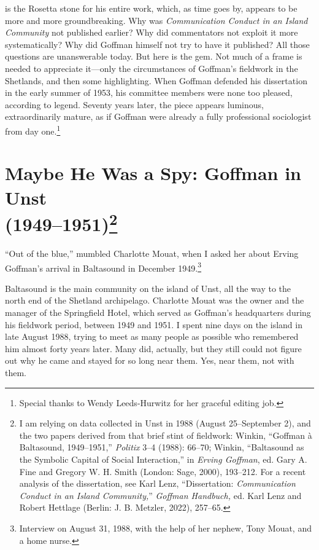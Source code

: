 \documentclass[twoside,symmetric,nobib,justified]{tufte-book}
\begin{document}
 is the Rosetta stone for his entire work,
which, as time goes by, appears to be more and more groundbreaking. Why
was \emph{Communication Conduct in an Island Community} not published
earlier? Why did commentators not exploit it more systematically? Why
did Goffman himself not try to have it published? All those questions
are unanswerable today. But here is the gem. Not much of a frame is
needed to appreciate it---only the circumstances of Goffman's fieldwork
in the Shetlands, and then some highlighting. When Goffman defended his
dissertation in the early summer of 1953, his committee members were
none too pleased, according to legend. Seventy years later, the piece
appears luminous, extraordinarily mature, as if Goffman were already a
fully professional sociologist from day one.\footnote{Special thanks to
  Wendy Leeds-Hurwitz for her graceful editing job.}

\vspace{.25in}

\hypertarget{maybe-he-was-a-spy-goffman-in-unst-19491951}{%
\section[Maybe He Was a Spy: Goffman in Unst
(1949--1951)]{\texorpdfstring{Maybe He Was a Spy: Goffman in Unst\\
(1949--1951)\footnote{I am relying on data collected in Unst in 1988
  (August 25--September 2), and the two papers derived from that brief
  stint of fieldwork: Winkin, ``Goffman à Baltasound, 1949--1951,''
  \emph{Politix} 3--4 (1988): 66--70; Winkin, ``Baltasound as the
  Symbolic Capital of Social Interaction,'' in \emph{Erving Goffman},
  ed. Gary A. Fine and Gregory W. H. Smith (London: Sage, 2000),
  193--212. For a recent analysis of the dissertation, see Karl Lenz,
  ``Dissertation: \emph{Communication Conduct in an Island Community,}''
  \emph{Goffman Handbuch,} ed. Karl Lenz and Robert Hettlage (Berlin: J.
  B. Metzler, 2022), 257--65.}}{Maybe He Was a Spy: Goffman in Unst (1949--1951)}}\label{maybe-he-was-a-spy-goffman-in-unst-19491951}}

``Out of the blue,'' mumbled Charlotte Mouat, when I asked her about
Erving Goffman's arrival in Baltasound in December 1949.\footnote{Interview
  on August 31, 1988, with the help of her nephew, Tony Mouat, and a
  home nurse.}

Baltasound is the main community on the island of Unst, all the way to
the north end of the Shetland archipelago. Charlotte Mouat was the owner
and the manager of the Springfield Hotel, which served as Goffman's
headquarters during his fieldwork period, between 1949 and 1951. I spent
nine days on the island in late August 1988, trying to meet as many
people as possible who remembered him almost forty years later. Many
did, actually, but they still could not figure out why he came and
stayed for so long near them. Yes, near them, not with them.
\end{document}
